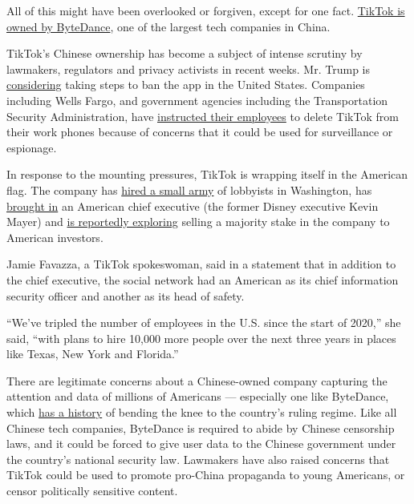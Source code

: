 All of this might have been overlooked or forgiven, except for one fact.
\href{https://www.nytimes3xbfgragh.onion/2020/08/03/technology/tiktok-trump-sale-microsoft.html}{TikTok
is owned by ByteDance}, one of the largest tech companies in China.

TikTok's Chinese ownership has become a subject of intense scrutiny by
lawmakers, regulators and privacy activists in recent weeks. Mr. Trump
is
\href{https://www.nytimes3xbfgragh.onion/reuters/2020/07/20/technology/20reuters-usa-election-trump-tiktok.html}{considering}
taking steps to ban the app in the United States. Companies including
Wells Fargo, and government agencies including the Transportation
Security Administration, have
\href{https://www.theverge.com/2020/7/11/21320935/wells-fargo-bans-tiktok-devices-amazon-pompeo}{instructed
their employees} to delete TikTok from their work phones because of
concerns that it could be used for surveillance or espionage.

In response to the mounting pressures, TikTok is wrapping itself in the
American flag. The company has
\href{https://www.nytimes3xbfgragh.onion/2020/07/15/technology/tiktok-washington-lobbyist.html}{hired
a small army} of lobbyists in Washington, has
\href{https://www.nytimes3xbfgragh.onion/2020/05/18/business/media/tiktok-ceo-kevin-mayer.html}{brought
in} an American chief executive (the former Disney executive Kevin
Mayer) and
\href{https://www.nytimes3xbfgragh.onion/2020/07/23/business/dealbook/tiktok-bytedance-investors-trump.html}{is
reportedly exploring} selling a majority stake in the company to
American investors.

Jamie Favazza, a TikTok spokeswoman, said in a statement that in
addition to the chief executive, the social network had an American as
its chief information security officer and another as its head of
safety.

``We've tripled the number of employees in the U.S. since the start of
2020,'' she said, ``with plans to hire 10,000 more people over the next
three years in places like Texas, New York and Florida.''

There are legitimate concerns about a Chinese-owned company capturing
the attention and data of millions of Americans --- especially one like
ByteDance, which
\href{https://www.nytimes3xbfgragh.onion/2019/11/05/business/tiktok-china-bytedance.html}{has
a history} of bending the knee to the country's ruling regime. Like all
Chinese tech companies, ByteDance is required to abide by Chinese
censorship laws, and it could be forced to give user data to the Chinese
government under the country's national security law. Lawmakers have
also raised concerns that TikTok could be used to promote pro-China
propaganda to young Americans, or censor politically sensitive content.


